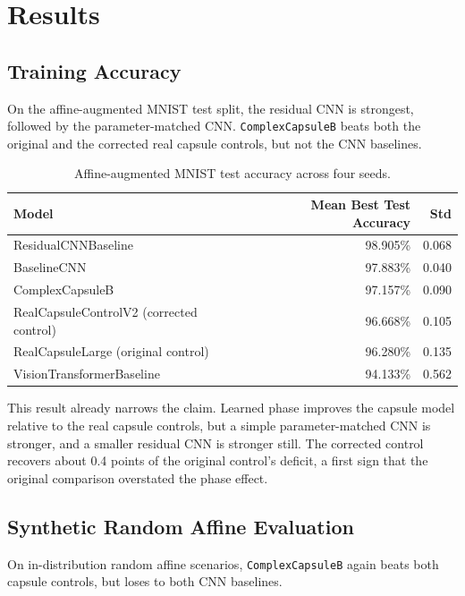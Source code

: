 \documentclass[11pt]{article}
\begin{document}
\section{Results}
\label{sec:results}

\subsection{Training Accuracy}
On the affine-augmented MNIST test split, the residual CNN is strongest, followed by the parameter-matched CNN. \texttt{ComplexCapsuleB} beats both the original and the corrected real capsule controls, but not the CNN baselines.

\begin{table}[t]
\centering
\small
\begin{tabular}{lrr}
\toprule
Model & Mean Best Test Accuracy & Std \\
\midrule
ResidualCNNBaseline & 98.905\% & 0.068 \\
BaselineCNN & 97.883\% & 0.040 \\
ComplexCapsuleB & 97.157\% & 0.090 \\
RealCapsuleControlV2 (corrected control) & 96.668\% & 0.105 \\
RealCapsuleLarge (original control) & 96.280\% & 0.135 \\
VisionTransformerBaseline & 94.133\% & 0.562 \\
\bottomrule
\end{tabular}
\caption{Affine-augmented MNIST test accuracy across four seeds.}
\label{tab:train}
\end{table}

This result already narrows the claim. Learned phase improves the capsule model relative to the real capsule controls, but a simple parameter-matched CNN is stronger, and a smaller residual CNN is stronger still. The corrected control recovers about 0.4 points of the original control's deficit, a first sign that the original comparison overstated the phase effect.

\subsection{Synthetic Random Affine Evaluation}
On in-distribution random affine scenarios, \texttt{ComplexCapsuleB} again beats both capsule controls, but loses to both CNN baselines.
\end{document}
